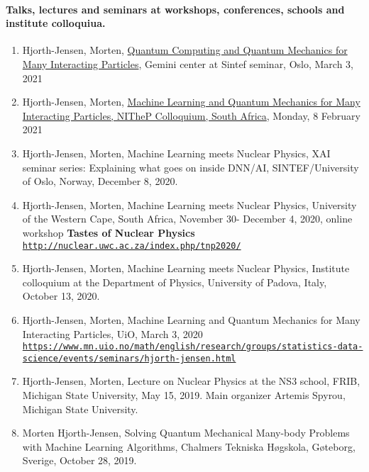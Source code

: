 \documentclass[%
oneside,                 %
final,                   %
10pt]{article}
\begin{document}
\paragraph{Talks, lectures and seminars at workshops, conferences, schools  and institute colloquiua.}
\begin{enumerate}
\item Hjorth-Jensen, Morten, \href{{https://mhjensenseminars.github.io/MachineLearningTalk/doc/pub/quantumcomputing/html/quantumcomputing-reveal.html}}{Quantum Computing and Quantum Mechanics for Many Interacting Particles}, Gemini center at Sintef seminar, Oslo, March 3, 2021

\item Hjorth-Jensen, Morten, \href{{https://www.youtube.com/watch?v=gzi9n8nGZSM&ab_channel=NITheCSKZN}}{Machine Learning and Quantum Mechanics for Many Interacting Particles, NITheP Colloquium, South Africa}, Monday, 8 February 2021

\item Hjorth-Jensen, Morten, Machine Learning meets Nuclear Physics, XAI seminar series: Explaining what goes on inside DNN/AI, SINTEF/University of Oslo, Norway, December 8, 2020.

\item Hjorth-Jensen, Morten, Machine Learning meets Nuclear Physics, University of the Western Cape, South Africa, November 30- December 4, 2020, online workshop \textbf{Tastes of Nuclear Physics}  \href{{http://nuclear.uwc.ac.za/index.php/tnp2020/}}{\nolinkurl{http://nuclear.uwc.ac.za/index.php/tnp2020/}}

\item Hjorth-Jensen, Morten, Machine Learning meets Nuclear Physics, Institute colloquium at the Department of Physics, University of Padova, Italy, October 13, 2020.

\item Hjorth-Jensen, Morten, Machine Learning and Quantum Mechanics for Many Interacting Particles, UiO, March 3, 2020  \href{{https://www.mn.uio.no/math/english/research/groups/statistics-data-science/events/seminars/hjorth-jensen.html}}{\nolinkurl{https://www.mn.uio.no/math/english/research/groups/statistics-data-science/events/seminars/hjorth-jensen.html}}

\item Hjorth-Jensen, Morten, Lecture on Nuclear Physics at the NS3 school, FRIB, Michigan State University, May 15, 2019. Main organizer Artemis Spyrou, Michigan State University.

\item Morten Hjorth-Jensen, Solving Quantum Mechanical Many-body Problems with Machine Learning Algorithms, Chalmers Tekniska Høgskola, Gøteborg, Sverige, October 28, 2019.


\end{enumerate}
\end{document}
